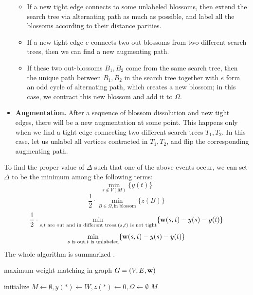 \begin{itemize}
	\begin{itemize}
		\item If a new tight edge connects to some unlabeled blossoms, then extend the search tree via alternating path as much as possible, and label all the blossoms according to their distance parities.
		\item If a new tight edge $e$ connects two out-blossoms from two different search trees, then we can find a new augmenting path. 
		\item If these two out-blossoms $B_1, B_2$ come from the same search tree, then the unique path between $B_1, B_2$ in the search tree together with $e$ form an odd cycle of alternating path, which creates a new blossom; in this case, we contract this new blossom and add it to $\Omega$.
	\end{itemize}
	\item \textbf{Augmentation.} After a sequence of blossom dissolution and new tight edges, there will be a new augmentation at some point. This happens only when we find a tight edge connecting two different search trees $T_1, T_2$. In this case, let us unlabel all vertices contracted in $T_1, T_2$, and flip the corresponding augmenting path.
\end{itemize}

To find the proper value of $\Delta$ such that one of the above events occur, we can set $\Delta$ to be the minimum among the following terms:
$$\min_{s\notin V(M)}\{y(t)\}$$ $$\frac{1}{2}\cdot\min_{B\in\Omega, \text{in blossom}}\{z(B)\}$$
$$\frac{1}{2}\cdot\min_{s, t\text{ are out and in different trees}, (s, t)\text{ is not tight}}\{\mathbf{w}(s, t) - y(s) - y(t)\}$$
$$\min_{s\text{ is out}, t\text{ is unlabeled}}\{\mathbf{w}(s, t) - y(s) - y(t)\}$$
The whole algorithm is summarized .

\begin{algorithm}[H]
	\caption{maximum weight matching in graph $G = (V, E, \mathbf{w})$}\label{blossom}
	initialize $M\leftarrow\emptyset, y(*)\leftarrow W, z(*)\leftarrow 0, \Omega\leftarrow \emptyset$\;
	\Return $M$\;
\end{algorithm}

